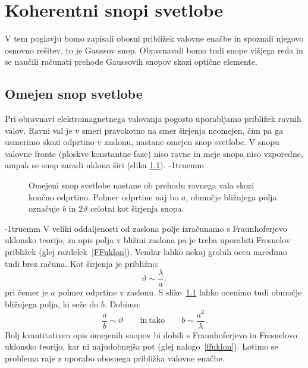 
\chapter{Koherentni snopi svetlobe}
V tem poglavju bomo zapisali obosni približek valovne enačbe in spoznali 
njegovo osnovno rešitev, to je Gaussov snop. Obravnavali bomo tudi snope višjega reda in
se naučili računati prehode Gaussovih snopov skozi optične elemente. 

\section{Omejen snop svetlobe}
Pri obravnavi elektromagnetnega valovanja pogosto uporabljamo
približek ravnih valov. Ravni val je v smeri pravokotno na smer širjenja
neomejen, čim pa ga usmerimo skozi odprtino
v zaslonu, nastane omejen snop svetlobe. V snopu valovne fronte (ploskve konstantne faze) 
niso ravne in meje snopa niso vzporedne, ampak se snop zaradi uklona širi 
(slika \ref{fig:Uklon-na-rezi}).
\vglue-1truemm
\begin{figure}[ht]
\centering
\def\svgwidth{100truemm} 

\caption{Omejeni snop svetlobe nastane ob prehodu ravnega vala skozi končno odprtino. 
Polmer odprtine naj bo $a$, območje bližnjega polja označuje $b$ in $2\vartheta$ 
celotni kot širjenja snopa.}
\label{fig:Uklon-na-rezi}
\end{figure}
\vglue-1truemm
V veliki oddaljenosti od zaslona polje izračunamo s
Fraunhoferjevo uklonsko teorijo, za 
opis polja v bližini zaslona pa je treba uporabiti 
Fresnelov približek (glej razdelek~\ref{FFuklon}). 
Vendar lahko nekaj grobih ocen naredimo tudi brez računa. Kot širjenja
je približno:
\begin{equation}
\vartheta\sim\frac{\lambda}{a},
\label{eq:kot_ocena}
\end{equation}
pri čemer je $a$ polmer odprtine v zaslonu.
S slike~\ref{fig:Uklon-na-rezi} lahko ocenimo tudi območje bližnjega polja, ki seže do $b$.
Dobimo:
\begin{equation}
\frac{a}{b}\sim \vartheta \qquad \mathrm{in~tako} \qquad b\sim\frac{a^2}{\lambda}.
\label{eq:z_ocena}
\end{equation}
Bolj kvantitativen opis omejenih
snopov bi dobili s Fraunhoferjevo in Fresnelovo uklonsko teorijo,
kar ni najudobnejša pot (glej nalogo~\ref{ffuklon}). Lotimo se problema raje z 
uporabo obosnega približka valovne enačbe.

